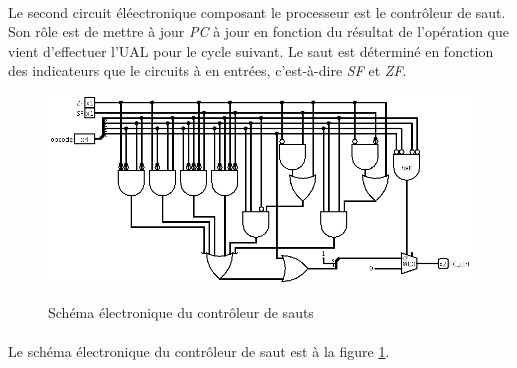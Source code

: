 \paragraph{}{
	Le second circuit éléectronique composant le processeur est
	le contrôleur de saut. Son rôle est de mettre à jour \textit{PC}
	à jour en fonction du résultat de l'opération que vient d'effectuer
	l'UAL pour le cycle suivant.
	Le saut est déterminé en fonction des indicateurs que le circuits
	à en entrées, c'est-à-dire \textit{SF} et \textit{ZF}.
}

\begin{figure}[!ht]
	\centering
	\includegraphics[scale=0.4,origin=c]{circuits/control_saut.png}
	\label{control_saut_circ}
	\caption{Sch\'{e}ma \'{e}lectronique du contr\^{o}leur de sauts}
\end{figure}

\paragraph{}{
	Le schéma électronique du contrôleur de saut est à la figure
	\ref{control_saut_circ}. 
}